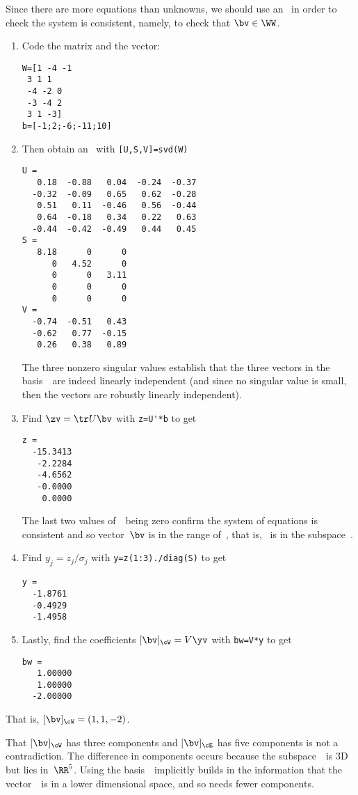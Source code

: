 \begin{example}
\begin{enumerate}
\begin{solution}
Since there are more equations than unknowns, we should use an \svd\ in order to check the system is consistent, namely, to check that \(\bv\in\WW\).
\begin{enumerate}
\item Code the matrix and the vector:
\begin{verbatim}
W=[1 -4 -1
 3 1 1
 -4 -2 0
 -3 -4 2
 3 1 -3]
b=[-1;2;-6;-11;10]
\end{verbatim}
\setbox\ajrqrbox\hbox{}%
\marginajrbox%
\item Then obtain an \svd\ with \verb|[U,S,V]=svd(W)| \twodp
\begin{verbatim}
U =
   0.18  -0.88   0.04  -0.24  -0.37
  -0.32  -0.09   0.65   0.62  -0.28
   0.51   0.11  -0.46   0.56  -0.44
   0.64  -0.18   0.34   0.22   0.63
  -0.44  -0.42  -0.49   0.44   0.45
S =
   8.18      0      0
      0   4.52      0
      0      0   3.11
      0      0      0
      0      0      0
V =
  -0.74  -0.51   0.43
  -0.62   0.77  -0.15
   0.26   0.38   0.89
\end{verbatim}
The three nonzero singular values establish that the three vectors in the basis~\cW\ are indeed linearly independent (and since no singular value is small, then the vectors are robustly linearly independent).

\item Find \(\zv=\tr U\bv\) with \verb|z=U'*b| to get
\begin{verbatim}
z =
  -15.3413
   -2.2284
   -4.6562
   -0.0000
    0.0000
\end{verbatim}
The last two values of~\zv\ being zero confirm the system of equations is consistent and so vector~\(\bv\) is in the range of~\cW, that is, \bv~is in the subspace~\WW.

\item Find \(y_j=z_j/\sigma_j\) with \verb|y=z(1:3)./diag(S)| to get
\begin{verbatim}
y =
  -1.8761
  -0.4929
  -1.4958
\end{verbatim}

\item Lastly, find the coefficients \([\bv]_\cW=V\yv\) with \verb|bw=V*y| to get
\begin{verbatim}
bw =
   1.00000
   1.00000
  -2.00000
\end{verbatim}
\end{enumerate}
That is, \([\bv]_\cW=(1,1,-2)\).

That \([\bv]_\cW\) has three components and \([\bv]_\cE\) has five components is not a contradiction.  
The difference in components occurs because the subspace~\WW\ is 3D but lies in~\(\RR^5\).  
Using the basis~\cW\ implicitly builds in the information that the vector~\bv\ is in a lower dimensional space, and so needs fewer components.
\end{solution}

\end{enumerate}
\end{example}


